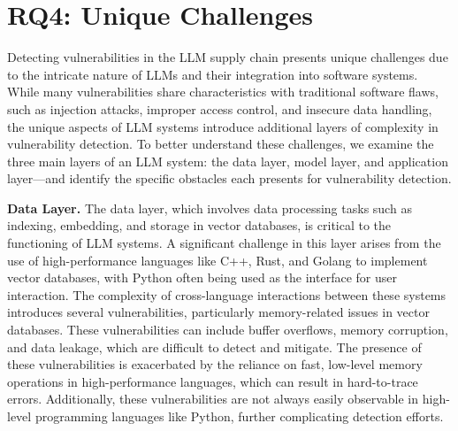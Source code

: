 \section{RQ4: Unique Challenges}
Detecting vulnerabilities in the LLM supply chain presents unique challenges due to the intricate nature of LLMs and their integration into software systems. While many vulnerabilities share characteristics with traditional software flaws, such as injection attacks, improper access control, and insecure data handling, the unique aspects of LLM systems introduce additional layers of complexity in vulnerability detection. To better understand these challenges, we examine the three main layers of an LLM system: the data layer, model layer, and application layer—and identify the specific obstacles each presents for vulnerability detection.

\noindent \textbf{Data Layer.}  
The data layer, which involves data processing tasks such as indexing, embedding, and storage in vector databases, is critical to the functioning of LLM systems. A significant challenge in this layer arises from the use of high-performance languages like C++, Rust, and Golang to implement vector databases, with Python often being used as the interface for user interaction. The complexity of cross-language interactions between these systems introduces several vulnerabilities, particularly memory-related issues in vector databases. These vulnerabilities can include buffer overflows, memory corruption, and data leakage, which are difficult to detect and mitigate. The presence of these vulnerabilities is exacerbated by the reliance on fast, low-level memory operations in high-performance languages, which can result in hard-to-trace errors. Additionally, these vulnerabilities are not always easily observable in high-level programming languages like Python, further complicating detection efforts.



